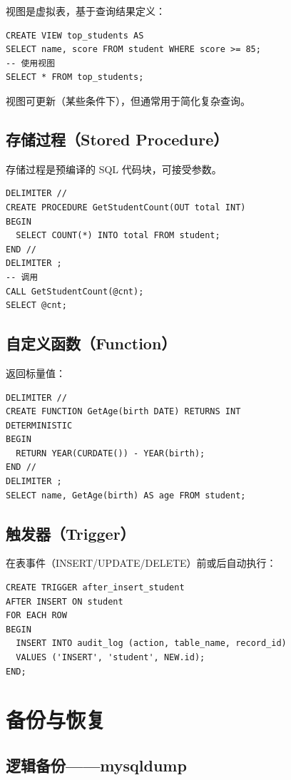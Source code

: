 \documentclass[12pt,UTF8]{ctexbook}
\begin{document}
视图是虚拟表，基于查询结果定义：

\begin{lstlisting}
CREATE VIEW top_students AS
SELECT name, score FROM student WHERE score >= 85;
-- 使用视图
SELECT * FROM top_students;
\end{lstlisting}

视图可更新（某些条件下），但通常用于简化复杂查询。

\section{存储过程（Stored Procedure）}

存储过程是预编译的 SQL 代码块，可接受参数。

\begin{lstlisting}
DELIMITER //
CREATE PROCEDURE GetStudentCount(OUT total INT)
BEGIN
  SELECT COUNT(*) INTO total FROM student;
END //
DELIMITER ;
-- 调用
CALL GetStudentCount(@cnt);
SELECT @cnt;
\end{lstlisting}

\section{自定义函数（Function）}

返回标量值：

\begin{lstlisting}
DELIMITER //
CREATE FUNCTION GetAge(birth DATE) RETURNS INT
DETERMINISTIC
BEGIN
  RETURN YEAR(CURDATE()) - YEAR(birth);
END //
DELIMITER ;
SELECT name, GetAge(birth) AS age FROM student;
\end{lstlisting}

\section{触发器（Trigger）}

在表事件（INSERT/UPDATE/DELETE）前或后自动执行：
\begin{lstlisting}
CREATE TRIGGER after_insert_student
AFTER INSERT ON student
FOR EACH ROW
BEGIN
  INSERT INTO audit_log (action, table_name, record_id)
  VALUES ('INSERT', 'student', NEW.id);
END;
\end{lstlisting}

\chapter{备份与恢复}
\label{ch:backup}

\section{逻辑备份——mysqldump}
\end{document}
